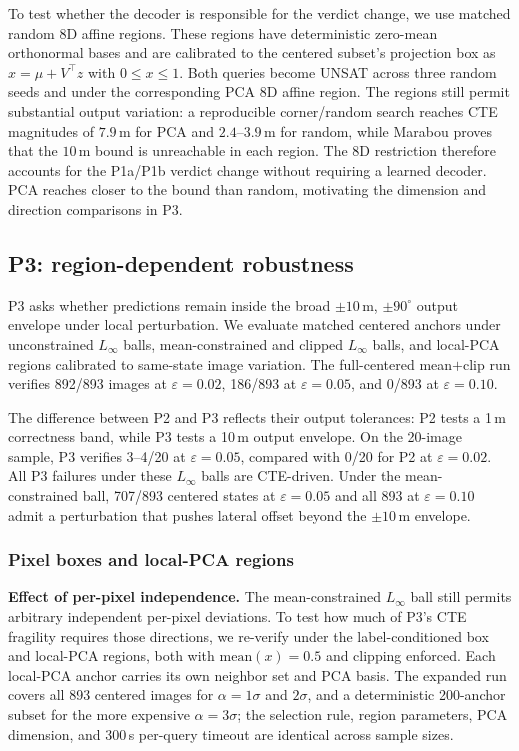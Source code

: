 \documentclass[twocolumn,smallextended,runningheads]{svjour3}
\begin{document}
To test whether the decoder is responsible for the verdict change, we use matched random 8D affine regions. These regions have deterministic zero-mean orthonormal bases and are calibrated to the centered subset's projection box as $x = \mu + V^\top z$ with $0\le x\le1$. Both queries become UNSAT across three random seeds and under the corresponding PCA 8D affine region. The regions still permit substantial output variation: a reproducible corner/random search reaches CTE magnitudes of $7.9$\,m for PCA and $2.4$--$3.9$\,m for random, while Marabou proves that the $10$\,m bound is unreachable in each region. The 8D restriction therefore accounts for the P1a/P1b verdict change without requiring a learned decoder. PCA reaches closer to the bound than random, motivating the dimension and direction comparisons in P3.


\subsection{P3: region-dependent robustness}
\label{sec:probe_p3}
\label{sec:p3_results}

P3 asks whether predictions remain inside the broad $\pm 10$\,m, $\pm 90^\circ$ output envelope under local perturbation. We evaluate matched centered anchors under unconstrained $L_\infty$ balls, mean-constrained and clipped $L_\infty$ balls, and local-PCA regions calibrated to same-state image variation. The full-centered mean$+$clip run verifies 892/893 images at $\varepsilon=0.02$, 186/893 at $\varepsilon=0.05$, and 0/893 at $\varepsilon=0.10$.

The difference between P2 and P3 reflects their output tolerances: P2 tests a 1\,m correctness band, while P3 tests a 10\,m output envelope. On the 20-image sample, P3 verifies 3--4/20 at $\varepsilon = 0.05$, compared with 0/20 for P2 at $\varepsilon = 0.02$. All P3 failures under these $L_\infty$ balls are CTE-driven. Under the mean-constrained ball, 707/893 centered states at $\varepsilon = 0.05$ and all 893 at $\varepsilon = 0.10$ admit a perturbation that pushes lateral offset beyond the $\pm 10$\,m envelope.


\subsubsection{Pixel boxes and local-PCA regions}
\label{sec:p3_region_comparison}

\textbf{Effect of per-pixel independence.} The mean-constrained $L_\infty$ ball still permits arbitrary independent per-pixel deviations. To test how much of P3's CTE fragility requires those directions, we re-verify under the label-conditioned box and local-PCA regions, both with $\text{mean}(x) = 0.5$ and clipping enforced. Each local-PCA anchor carries its own neighbor set and PCA basis. The expanded run covers all 893 centered images for $\alpha{=}1\sigma$ and $2\sigma$, and a deterministic 200-anchor subset for the more expensive $\alpha{=}3\sigma$; the selection rule, region parameters, PCA dimension, and 300\,s per-query timeout are identical across sample sizes.
\end{document}
